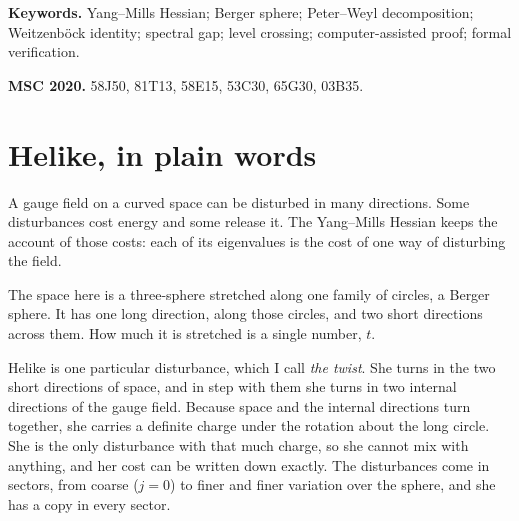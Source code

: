 \documentclass[11pt]{article}
\theoremstyle{definition}
\theoremstyle{remark}
\begin{document}
\begin{abstract}
pre-registered. At $48$ new points the region in the sectors $j\le12$ is one interval on a $0.01$ grid, no sector
$13\le j\le79$ undercuts the twist at the three tested values of $x<0$, and the edge is the $P_2$ root at $34$ of $38$
points. At $193$ random circle-symmetric fields the region in $j\le12$ is again one interval, but the reading that the
competitor is nearly blind to $x$ fails at $129$. In an $SU(3)$ family stretched along the hypercharge circle with a
free fibre field, the twist is the floor of all nine tested sectors at no $x$ of the $0.25$ scan, at any of $20$ shapes.
Stretched instead along the twist's own charge circle, the same group gives her back: she is the floor at $19$ of $20$
shapes, in one interval, on the side where the field along her circle turns against her charge. For $x>0$ the floor of
every sector is held, from small $j$ on, by a state that turns against the field ($60$ of $60$ points). Swept across
the Weyl chambers of $SU(4)$ and $Sp(2)$, she lives on the coroot of her own highest root, not on the principal circle.
\end{abstract}

\noindent\textbf{Keywords.} Yang--Mills Hessian; Berger sphere; Peter--Weyl decomposition; Weitzenb\"ock identity;
spectral gap; level crossing; computer-assisted proof; formal verification.

\noindent\textbf{MSC 2020.} 58J50, 81T13, 58E15, 53C30, 65G30, 03B35.

\section*{Helike, in plain words}\label{sec:plain}

A gauge field on a curved space can be disturbed in many directions. Some disturbances cost energy and some release
it. The Yang--Mills Hessian keeps the account of those costs: each of its eigenvalues is the cost of one way of
disturbing the field.

The space here is a three-sphere stretched along one family of circles, a Berger sphere. It has one long direction,
along those circles, and two short directions across them. How much it is stretched is a single number, $t$.

Helike is one particular disturbance, which I call \emph{the twist}. She turns in the two short directions of space,
and in step with them she turns in two internal directions of the gauge field. Because space and the internal
directions turn together, she carries a definite charge under the rotation about the long circle. She is the only
disturbance with that much charge, so she cannot mix with anything, and her cost can be written down exactly. The
disturbances come in sectors, from coarse ($j=0$) to finer and finer variation over the sphere, and she has a copy in
every sector.
\end{document}

